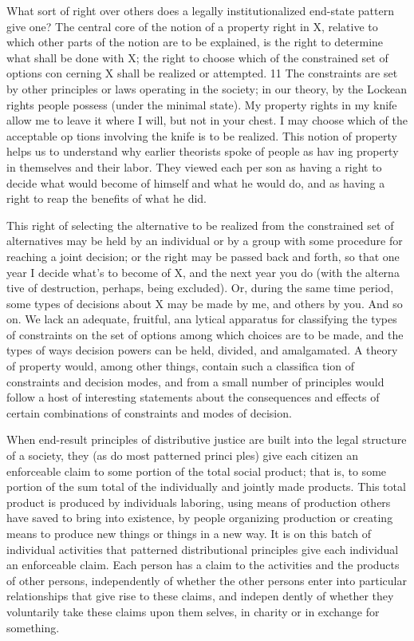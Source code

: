 \documentclass[11pt,openany]{book}
\begin{document}
What sort of right over others does a legally institutionalized end-state pattern give one? The central core of the notion of a property right in X, relative to which other parts of the notion are to be explained, is the right to determine what shall be done with X; the right to choose which of the constrained set of options con cerning X shall be realized or attempted. 11 The constraints are set by other principles or laws operating in the society; in our theory, by the Lockean rights people possess (under the minimal state). My property rights in my knife allow me to leave it where I will, but not in your chest. I may choose which of the acceptable op tions involving the knife is to be realized. This notion of property helps us to understand why earlier theorists spoke of people as hav ing property in themselves and their labor. They viewed each per son as having a right to decide what would become of himself and what he would do, and as having a right to reap the benefits of what he did. 

This right of selecting the alternative to be realized from the constrained set of alternatives may be held by an individual or by a group with some procedure for reaching a joint decision; or the right may be passed back and forth, so that one year I decide what's to become of X, and the next year you do (with the alterna tive of destruction, perhaps, being excluded). Or, during the same time period, some types of decisions about X may be made by me, and others by you. And so on. We lack an adequate, fruitful, ana lytical apparatus for classifying the types of constraints on the set of options among which choices are to be made, and the types of ways decision powers can be held, divided, and amalgamated. A theory of property would, among other things, contain such a classifica tion of constraints and decision modes, and from a small number of principles would follow a host of interesting statements about the consequences and effects of certain combinations of constraints and modes of decision. 

When end-result principles of distributive justice are built into the legal structure of a society, they (as do most patterned princi ples) give each citizen an enforceable claim to some portion of the total social product; that is, to some portion of the sum total of the individually and jointly made products. This total product is produced by individuals laboring, using means of production others have saved to bring into existence, by people organizing production or creating means to produce new things or things in a new way. It is on this batch of individual activities that patterned distributional principles give each individual an enforceable claim. Each person has a claim to the activities and the products of other persons, independently of whether the other persons enter into particular relationships that give rise to these claims, and indepen dently of whether they voluntarily take these claims upon them selves, in charity or in exchange for something. 
\end{document}
